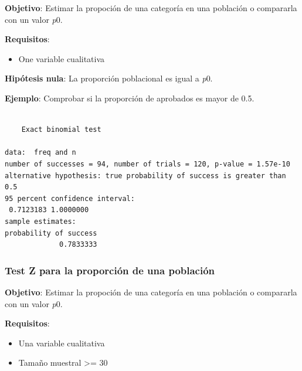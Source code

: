 \documentclass[
  a4paper,
]{scrreport}
\newenvironment{Shaded}{\begin{snugshade}}{\end{snugshade}}
\newcommand{\AttributeTok}[1]{\textcolor[rgb]{0.40,0.45,0.13}{#1}}
\newcommand{\FloatTok}[1]{\textcolor[rgb]{0.68,0.00,0.00}{#1}}
\newcommand{\FunctionTok}[1]{\textcolor[rgb]{0.28,0.35,0.67}{#1}}
\newcommand{\NormalTok}[1]{\textcolor[rgb]{0.00,0.23,0.31}{#1}}
\newcommand{\OtherTok}[1]{\textcolor[rgb]{0.00,0.23,0.31}{#1}}
\newcommand{\SpecialCharTok}[1]{\textcolor[rgb]{0.37,0.37,0.37}{#1}}
\newcommand{\StringTok}[1]{\textcolor[rgb]{0.13,0.47,0.30}{#1}}
\providecommand{\tightlist}{%
  \setlength{\itemsep}{0pt}\setlength{\parskip}{0pt}}\usepackage{longtable,booktabs,array}
\theoremstyle{definition}
\theoremstyle{definition}
\theoremstyle{remark}
\begin{document}
\textbf{Objetivo}: Estimar la propoción de una categoría en una
población o compararla con un valor \emph{p}0.

\textbf{Requisitos}:

\begin{itemize}
\tightlist
\item
  One variable cualitativa
\end{itemize}

\textbf{Hipótesis nula}: La proporción poblacional es igual a \emph{p}0.

\textbf{Ejemplo}: Comprobar si la proporción de aprobados es mayor de
0.5.

\begin{Shaded}
\end{Shaded}

\begin{verbatim}

    Exact binomial test

data:  freq and n
number of successes = 94, number of trials = 120, p-value = 1.57e-10
alternative hypothesis: true probability of success is greater than 0.5
95 percent confidence interval:
 0.7123183 1.0000000
sample estimates:
probability of success 
             0.7833333 
\end{verbatim}

\hypertarget{test-z-para-la-proporciuxf3n-de-una-poblaciuxf3n}{%
\subsubsection{Test Z para la proporción de una
población}\label{test-z-para-la-proporciuxf3n-de-una-poblaciuxf3n}}

\textbf{Objetivo}: Estimar la propoción de una categoría en una
población o compararla con un valor \emph{p}0.

\textbf{Requisitos}:

\begin{itemize}
\tightlist
\item
  Una variable cualitativa
\item
  Tamaño muestral \textgreater= 30
\end{itemize}
\end{document}
